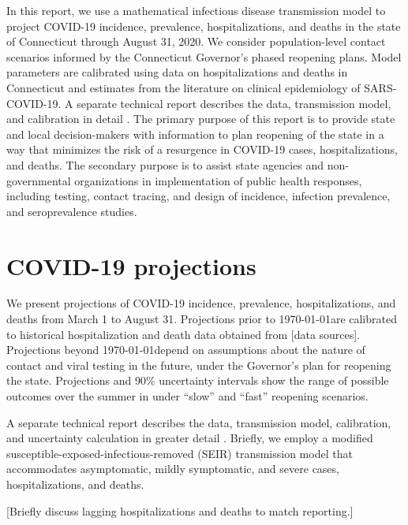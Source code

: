\documentclass[11pt]{article}
\begin{document}

In this report, we use a mathematical infectious disease transmission model to project COVID-19 incidence, prevalence, hospitalizations, and deaths in the state of Connecticut through August 31, 2020.  We consider population-level contact scenarios informed by the Connecticut Governor's phased reopening plans.  Model parameters are calibrated using data on hospitalizations and deaths in Connecticut and estimates from the literature on clinical epidemiology of SARS-COVID-19.  A separate technical report describes the data, transmission model, and calibration in detail \citep{morozova2020tech}.  The primary purpose of this report is to provide state and local decision-makers with information to plan reopening of the state in a way that minimizes the risk of a resurgence in COVID-19 cases, hospitalizations, and deaths.  The secondary purpose is to assist state agencies and non-governmental organizations in implementation of public health responses, including testing, contact tracing, and design of incidence, infection prevalence, and seroprevalence studies. 





\section*{COVID-19 projections} 

We present projections of COVID-19 incidence, prevalence, hospitalizations, and deaths from March 1 to August 31.  Projections prior to \today are calibrated to historical hospitalization and death data obtained from [data sources].  Projections beyond \today depend on assumptions about the nature of contact and viral testing in the future, under the Governor's plan for reopening the state.  Projections and 90\% uncertainty intervals show the range of possible outcomes over the summer in under ``slow'' and ``fast'' reopening scenarios.  

A separate technical report describes the data, transmission model, calibration, and uncertainty calculation in greater detail \citep{morozova2020tech}.  Briefly, we employ a modified susceptible-exposed-infectious-removed (SEIR) transmission model that accommodates asymptomatic, mildly symptomatic, and severe cases, hospitalizations, and deaths.  

[Briefly discuss lagging hospitalizations and deaths to match reporting.]
\end{document}
